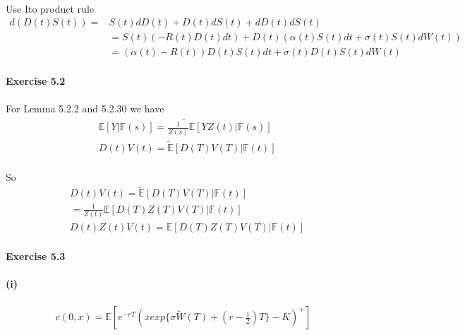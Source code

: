 \documentclass{article}
\begin{document}
\paragraph{}{Use Ito product rule}
\begin{align*}
  d(D(t)S(t)) =&S(t)dD(t)+D(t)dS(t)+dD(t)dS(t)  \\
   & =S(t)(-R(t)D(t)dt)+D(t)(\alpha(t)S(t)dt+\sigma(t)S(t)dW(t))\\
   &=(\alpha(t)-R(t))D(t)S(t)dt+\sigma(t)D(t)S(t)dW(t)
\end{align*}
\paragraph{Exercise 5.2}
\paragraph{}{For Lemma 5.2.2 and 5.2.30 we have}
\begin{align*}
  &\tilde{\mathbb{E}[Y|\mathbb{F}(s)]=\frac{1}{Z(s)}\mathbb{E}[YZ(t)|\mathbb{F}(s)]}
   \\
  &D(t)V(t)=\tilde{\mathbb{E}}[D(T)V(T)|\mathbb{F}(t)]
\end{align*}
\paragraph{}{So}
\begin{align*}
  &D(t)V(t)=\tilde{\mathbb{E}}[D(T)V(T)|\mathbb{F}(t)]\\
  &=\frac{1}{Z(t)}\mathbb{E}[D(T)Z(T)V(T)|\mathbb{F}(t)]\\
   &D(t)Z(t)V(t)=\mathbb{E}[D(T)Z(T)V(T)|\mathbb{F}(t)]
\end{align*}
\paragraph{Exercise 5.3}
\paragraph{(i)}
\begin{align*}
  c(0,x)=\mathbb{E}[e^{-rT}(x exp\{\sigma\tilde{W}(T)+(r-\frac{1}{2})T\}-K)^{+} ]
\end{align*}
\end{document}
